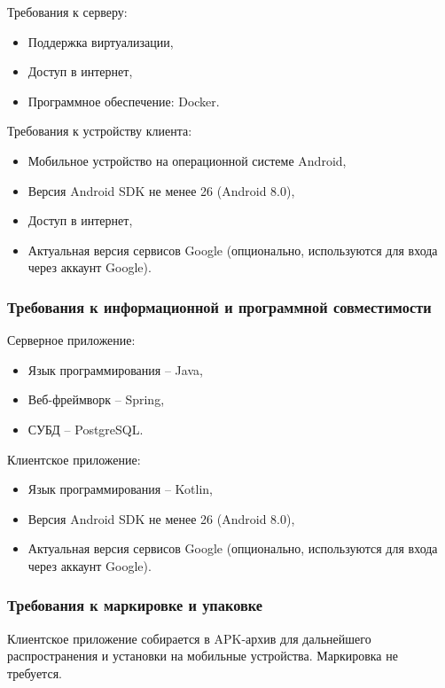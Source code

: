 \documentclass[a4paper, 14pt]{article}
\begin{document}
Требования к серверу:
\begin{itemize}
    \item Поддержка виртуализации,
    \item Доступ в интернет,
    \item Программное обеспечение: Docker.
\end{itemize}

\noindent Требования к устройству клиента:
\begin{itemize}
    \item Мобильное устройство на операционной системе Android,
    \item Версия Android SDK не менее 26 (Android 8.0),
    \item Доступ в интернет,
    \item Актуальная версия сервисов Google (опционально, используются для входа через аккаунт Google).
\end{itemize}

\subsubsection{Требования к информационной и программной совместимости}

Серверное приложение:
\begin{itemize}
    \item Язык программирования -- Java,
    \item Веб-фреймворк -- Spring,
    \item СУБД -- PostgreSQL.
\end{itemize}

\noindent Клиентское приложение:
\begin{itemize}
    \item Язык программирования -- Kotlin,
    \item Версия Android SDK не менее 26 (Android 8.0),
    \item Актуальная версия сервисов Google (опционально, используются для входа через аккаунт Google).
\end{itemize}

\subsubsection{Требования к маркировке и упаковке}

Клиентское приложение собирается в APK-архив для дальнейшего
распространения и установки на мобильные устройства.
Маркировка не требуется.
\end{document}
